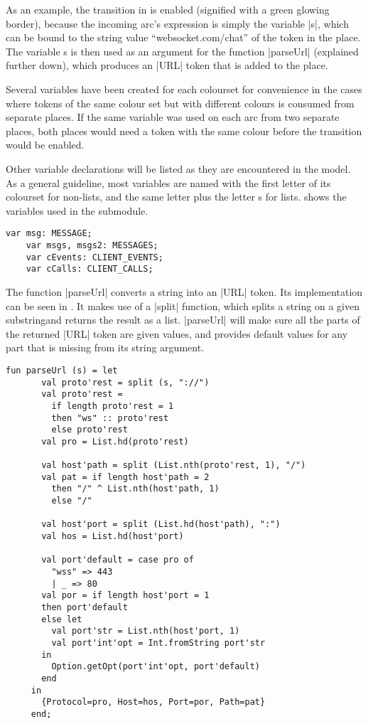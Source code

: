 	As an example, the  transition in  is
	enabled (signified with a green glowing border), because the incoming arc's
	expression is simply the variable |s|, which can be bound to the string value
	``websocket.com/chat'' of the token in the  place. The variable
	s is then used as an argument for the function |parseUrl| (explained further
	down), which produces an |URL| token that is added to the  place.
	
	Several variables have been created for each colourset for convenience in
	the cases where tokens of the same colour set but with different colours is
	consumed from separate places. If the same variable was used on each arc from
	two separate places, both places would need a token with the same colour
	before the transition would be enabled.
	
	Other variable declarations will be listed as they are encountered in the
	model. As a general guideline, most variables are named with the first letter
	of its colourset for non-lists, and the same letter plus the letter s for
	lists.  shows the variables used in the
	 submodule.
	
	\begin{lstlisting}[label=lst:client_app_vars,caption=Client Application
	Variables,gobble=1]
	var msg: MESSAGE;
	var msgs, msgs2: MESSAGES;
	var cEvents: CLIENT_EVENTS;
	var cCalls: CLIENT_CALLS;
	\end{lstlisting}
	
	The function |parseUrl| converts a string into an |URL| token. Its
	implementation can be seen in . It makes use of a
	|split| function, which splits a string on a given substringand returns the
	result as a list. |parseUrl| will make sure all the parts of the returned |URL|
	token are given values, and provides default values for any part that is
	missing from its string argument. 
	
	\begin{lstlisting}[label=lst:client_app_parseUrl,caption=The parseUrl function,gobble=1,float] 
	 fun parseUrl (s) = let
	   val proto'rest = split (s, "://")
	   val proto'rest = 
	     if length proto'rest = 1 
	     then "ws" :: proto'rest 
	     else proto'rest 
	   val pro = List.hd(proto'rest)
	 
	   val host'path = split (List.nth(proto'rest, 1), "/")
	   val pat = if length host'path = 2
	     then "/" ^ List.nth(host'path, 1)
	     else "/"
	   
	   val host'port = split (List.hd(host'path), ":")
	   val hos = List.hd(host'port)
	 
	   val port'default = case pro of
	     "wss" => 443
	     | _ => 80
	   val por = if length host'port = 1 
	   then port'default
	   else let
	     val port'str = List.nth(host'port, 1)
	     val port'int'opt = Int.fromString port'str
	   in
	     Option.getOpt(port'int'opt, port'default)
	   end
	 in
	   {Protocol=pro, Host=hos, Port=por, Path=pat}
	 end;
	\end{lstlisting}
	

